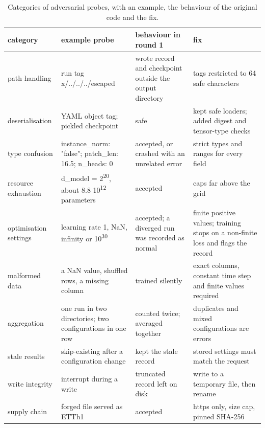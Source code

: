 \documentclass[11pt,letterpaper]{article}
\begin{document}
\begin{table}[htbp]
\centering
\caption{Categories of adversarial probes, with an example, the behaviour of the original code and the fix.}\label{tab:14}
{\footnotesize\setlength{\tabcolsep}{3pt}
\begin{tabular}{>{\raggedright\arraybackslash}p{}>{\raggedright\arraybackslash}p{}>{\raggedright\arraybackslash}p{}>{\raggedright\arraybackslash}p{}}
\toprule
\textbf{category} & \textbf{example probe} & \textbf{behaviour in round 1} & \textbf{fix} \\
\midrule
path handling & run tag x/../../../escaped & wrote record and checkpoint outside the output directory & tags restricted to 64 safe characters \\
deserialisation & YAML object tag; pickled checkpoint & safe & kept safe loaders; added digest and tensor-type checks \\
type confusion & instance\_norm: "false"; patch\_len: 16.5; n\_heads: 0 & accepted, or crashed with an unrelated error & strict types and ranges for every field \\
resource exhaustion & d\_model = 2\textsuperscript{20}, about 8.8 \texttimes{} 10\textsuperscript{12} parameters & accepted & caps far above the grid \\
optimisation settings & learning rate \textminus{}1, NaN, infinity or 10\textsuperscript{30} & accepted; a diverged run was recorded as normal & finite positive values; training stops on a non-finite loss and flags the record \\
malformed data & a NaN value, shuffled rows, a missing column & trained silently & exact columns, constant time step and finite values required \\
aggregation & one run in two directories; two configurations in one row & counted twice; averaged together & duplicates and mixed configurations are errors \\
stale results & skip-existing after a configuration change & kept the stale record & stored settings must match the request \\
write integrity & interrupt during a write & truncated record left on disk & write to a temporary file, then rename \\
supply chain & forged file served as ETTh1 & accepted & https only, size cap, pinned SHA-256 \\
\bottomrule
\end{tabular}}
\end{table}
\end{document}
